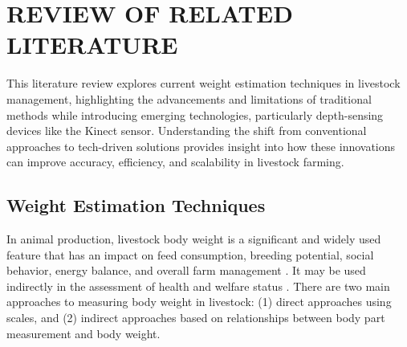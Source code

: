 \chapter{REVIEW OF RELATED LITERATURE}
{\baselineskip
This literature review explores current weight estimation techniques in livestock management, highlighting the advancements and limitations of traditional methods while introducing emerging technologies, particularly depth-sensing devices like the Kinect sensor. Understanding the shift from conventional approaches to tech-driven solutions provides insight into how these innovations can improve accuracy, efficiency, and scalability in livestock farming.

\section{Weight Estimation Techniques}
In animal production, livestock body weight is a significant and widely used feature that has an impact on feed consumption, breeding potential, social behavior, energy balance, and overall farm management \citep{wang2024review}. It may be used indirectly in the assessment of health and welfare status \citep{dikmen2012effect}. There are two main approaches to measuring body weight in livestock: (1) direct approaches using scales, and (2) indirect approaches based on relationships between body part measurement and body weight.

}
